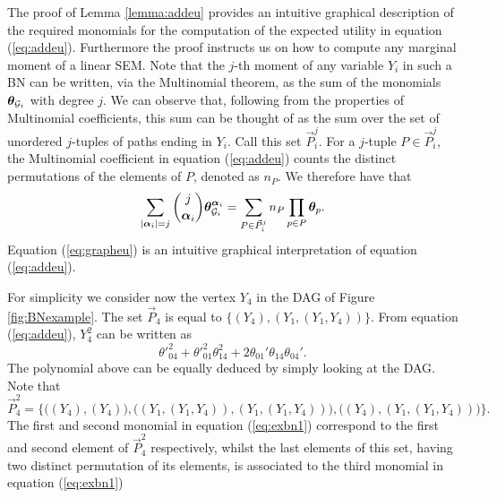 The proof of Lemma \ref{lemma:addeu} provides an intuitive graphical description of the required monomials for the computation of the expected utility in equation (\ref{eq:addeu}). Furthermore the proof instructs us on how to compute any marginal moment of a linear SEM. Note that the $j$-th moment of any variable $Y_i$ in such a BN can be written, via the Multinomial theorem, as the sum of the monomials $\bm{\theta}_{\mathcal{G}_i}$ with degree $j$. We can observe that, following from the properties of Multinomial coefficients, this sum can be thought of as the sum over the set of unordered $j$-tuples of paths ending in $Y_i$. Call this set $\vec{P}^j_i$. For a $j$-tuple $P\in\vec{P}^j_i$, the Multinomial coefficient in equation (\ref{eq:addeu}) counts the distinct permutations of the elements of $P$, denoted as $n_P$. We therefore have that
\begin{equation}
\label{eq:grapheu}
\sum_{|\bm{\alpha}_i|=j}\binom{j}{\bm{\alpha}_i}\bm{\theta}_{\Gr_i}^{\bm{\alpha}_i}=\sum_{P\in\vec{P}^j_i}n_P\prod_{p\in P}\bm{\theta}_p.
\end{equation} 
 Equation (\ref{eq:grapheu}) is an intuitive graphical interpretation of equation (\ref{eq:addeu}).

\begin{example}
For simplicity we consider now the vertex $Y_4$ in the DAG of Figure \ref{fig:BNexample}. The set $\vec{P}_4$ is equal to $\{(Y_4), (Y_1,(Y_1,Y_4))\}$. From equation (\ref{eq:addeu}), $Y_4^2$ can be written as 
\begin{equation}
\label{eq:exbn1}
\theta'^2_{04}+\theta'^2_{01}\theta_{14}^2+2\theta_{01}'\theta_{14}\theta_{04}'.
\end{equation}
The polynomial above can be equally deduced by simply looking at the DAG. Note that 
\begin{equation*}
\vec{P}_4^2=\Big\{\big((Y_4),(Y_4)\big), \big((Y_1,(Y_1,Y_4)),(Y_1,(Y_1,Y_4))\big), \big((Y_4),(Y_1,(Y_1,Y_4))\big)\Big\}.
\end{equation*}
The first and second monomial in equation (\ref{eq:exbn1}) correspond to the first and second element of $\vec{P}_4^2$ respectively, whilst the last elements of this set, having two distinct permutation of its elements, is associated to the third monomial in equation (\ref{eq:exbn1})
\end{example}

